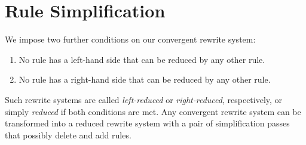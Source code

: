 \documentclass[../generics]{subfiles}
\begin{document}
\newcommand{\AssocIntro}[2]{\protosym{#1}.\texttt{#2}\Rightarrow\assocsym{#1}{#2}}
\newcommand{\AssocIntroInv}[2]{\assocsym{#1}{#2}\Rightarrow\protosym{#1}.\texttt{#2}}

\newcommand{\InheritAssocIntro}[3]{\protosym{#1}.\assocsym{#2}{#3}\Rightarrow\assocsym{#1}{#3}}
\newcommand{\InheritAssocIntroInv}[3]{\assocsym{#1}{#3}\Rightarrow\protosym{#1}.\assocsym{#2}{#3}}

\newcommand{\ProtoConf}[2]{#1.\protosym{#2}\Rightarrow #1}
\newcommand{\ProtoConfInv}[2]{#1\Rightarrow #1.\protosym{#2}}

\newcommand{\ProtoInherit}[2]{\ProtoConf{\protosym{#1}}{#2}}
\newcommand{\ProtoInheritInv}[2]{\ProtoConfInv{\protosym{#1}}{#2}}

\newcommand{\FourLoopDerived}[8]{%
\begin{tikzcd}[ampersand replacement=\&]%
\&#1\arrow[ld, Rightarrow, "#5"', bend right]\&\\
#2\arrow[rd, Rightarrow, "#6"', bend right, dashed]\&\&#4\arrow[lu, Rightarrow,"#8"', bend right]\\
\&#3\arrow[ru, Rightarrow, "#7"', bend right]\&
\end{tikzcd}}
\newcommand{\FourLoopDerivedOther}[8]{%
\begin{tikzcd}[ampersand replacement=\&]%
\&#1\arrow[ld, Rightarrow, "#5"', bend right]\&\\
#2\arrow[rd, Rightarrow, "#6"', bend right]\&\&#4\arrow[lu, Rightarrow,"#8"', bend right]\\
\&#3\arrow[ru, Rightarrow, "#7"', bend right, dashed]\&
\end{tikzcd}}
\newcommand{\FourLoopTrivial}[8]{%
\begin{tikzcd}[ampersand replacement=\&]%
\&#1\arrow[ld, Rightarrow, "#5"', bend right]\&\\
#2\arrow[rd, Rightarrow, "#6"', bend right]\&\&#4\arrow[lu, Rightarrow,"#8"', bend right]\\
\&#3\arrow[ru, Rightarrow, "#7"', bend right]\&
\end{tikzcd}}

\section{Rule Simplification}\label{rule reduction}

We impose two further conditions on our convergent rewrite system:
\begin{enumerate}
\item No rule has a left-hand side that can be reduced by any other rule.
\item No rule has a right-hand side that can be reduced by any other rule.
\end{enumerate}
Such rewrite systems are called \emph{left-reduced} or \emph{right-reduced}, respectively, or simply \emph{reduced} if both conditions are met. Any convergent rewrite system can be transformed into a reduced rewrite system with a pair of simplification passes that possibly delete and add rules.
\end{document}
